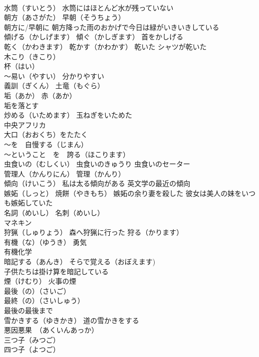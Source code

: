 \documentclass[8pt]{extreport}
\begin{document}
\begin{CJK}{UTF8}{min}
\\	水筒（すいとう） 水筒にはほとんど水が残っていない
\\	朝方（あさがた） 早朝（そうちょう）
\\	朝方に/早朝に 朝方降った雨のおかげで今日は緑がいきいきしている
\\	傾げる（かしげます） 傾ぐ（かしぎます） 首をかしげる
\\	乾く（かわきます） 乾かす（かわかす） 乾いた シャツが乾いた
\\	木こり（きこり） 
\\	杯（はい）
\\	～易い（やすい） 分かりやすい
\\	義訓（ぎくん） 土竜（もぐら）
\\	垢（あか） 赤（あか） 
\\	垢を落とす
\\	炒める（いためます） 玉ねぎをいためた
\\	中央アフリカ
\\	大口（おおくち）をたたく 
\\	～を　自慢する（じまん）
\\	～ということ　を　誇る（ほこります）
\\	虫食いの（むしくい） 虫食いのきゅうり 虫食いのセーター
\\	管理人（かんりにん） 管理（かんり）
\\	傾向（けいこう） 私は太る傾向がある 英文学の最近の傾向
\\	嫉妬（しっと） 焼餅（やきもち） 嫉妬の余り妻を殺した 彼女は美人の妹をいつも嫉妬していた
\\	名詞（めいし） 名刺（めいし） 
\\	マネキン
\\	狩猟（しゅりょう） 森へ狩猟に行った 狩る（かります）
\\	有機（な）（ゆうき） 勇気 
\\	有機化学
\\	暗記する（あんき） そらで覚える（おぼえます) 
\\	子供たちは掛け算を暗記している
\\	煙（けむり） 火事の煙
\\	最後（の）（さいご） 
\\	最終（の）（さいしゅう） 
\\	最後の最後まで
\\	雪かきする（ゆきかき） 道の雪かきをする
\\	悪因悪果　（あくいんあっか）
\\	三つ子（みつご）　
\\	四つ子（よつご）

\end{CJK}
\end{document}
